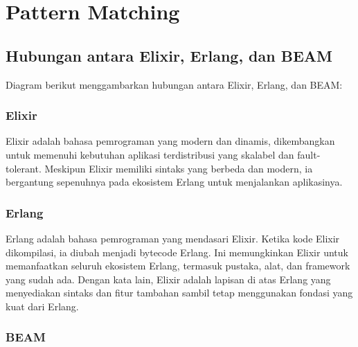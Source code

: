\chapter{Pattern Matching}

\section{Hubungan antara Elixir, Erlang, dan BEAM}

Diagram berikut menggambarkan hubungan antara Elixir, Erlang, dan BEAM:

\begin{center}
\end{center}


\subsection{Elixir}

Elixir adalah bahasa pemrograman yang modern dan dinamis, dikembangkan untuk memenuhi kebutuhan aplikasi terdistribusi yang skalabel dan fault-tolerant. Meskipun Elixir memiliki sintaks yang berbeda dan modern, ia bergantung sepenuhnya pada ekosistem Erlang untuk menjalankan aplikasinya.

\subsection{Erlang}

Erlang adalah bahasa pemrograman yang mendasari Elixir. Ketika kode Elixir dikompilasi, ia diubah menjadi bytecode Erlang. Ini memungkinkan Elixir untuk memanfaatkan seluruh ekosistem Erlang, termasuk pustaka, alat, dan framework yang sudah ada. Dengan kata lain, Elixir adalah lapisan di atas Erlang yang menyediakan sintaks dan fitur tambahan sambil tetap menggunakan fondasi yang kuat dari Erlang.

\subsection{BEAM}

